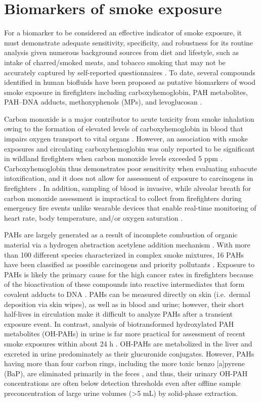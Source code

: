 \documentclass[preprint, 3p,
authoryear]{elsarticle} %
\begin{document}
\section{Biomarkers of smoke
exposure}\label{biomarkers-of-smoke-exposure}

For a biomarker to be considered an effective indicator of smoke
exposure, it must demonstrate adequate sensitivity, specificity, and
robustness for its routine analysis given numerous background sources
from diet and lifestyle, such as intake of charred/smoked meats, and
tobacco smoking that may not be accurately captured by self-reported
questionnaires \citep{18}. To date, several compounds identified in
human biofluids have been proposed as putative biomarkers of wood smoke
exposure in firefighters including carboxyhemoglobin, PAH metabolites,
PAH--DNA adducts, methoxyphenols (MPs), and levoglucosan \citep{19}.

Carbon monoxide is a major contributor to acute toxicity from smoke
inhalation owing to the formation of elevated levels of
carboxyhemoglobin in blood that impairs oxygen transport to vital organs
\citep{20}. However, an association with smoke exposures and circulating
carboxyhemoglobin was only reported to be significant in wildland
firefighters when carbon monoxide levels exceeded 5 ppm \citep{19}.
Carboxyhemoglobin thus demonstrates poor sensitivity when evaluating
subacute intoxification, and it does not allow for assessment of
exposure to carcinogens in firefighters \citep{21}. In addition,
sampling of blood is invasive, while alveolar breath for carbon monoxide
assessment is impractical to collect from firefighters during emergency
fire events \citep{22} unlike wearable devices that enable real-time
monitoring of heart rate, body temperature, and/or oxygen saturation
\citep{23}.

PAHs are largely generated as a result of incomplete combustion of
organic material via a hydrogen abstraction acetylene addition mechanism
\citep{24}. With more than 100 different species characterized in
complex smoke mixtures, 16 PAHs have been classified as possible
carcinogens and priority pollutants \citep{25}. Exposure to PAHs is
likely the primary cause for the high cancer rates in firefighters
because of the bioactivation of these compounds into reactive
intermediates that form covalent adducts to DNA \citep{26}. PAHs can be
measured directly on skin (i.e.~dermal deposition via skin wipes), as
well as in blood and urine; however, their short half-lives in
circulation make it difficult to analyze PAHs after a transient exposure
event. In contrast, analysis of biotransformed hydroxylated PAH
metabolites (OH-PAHs) in urine is far more practical for assessment of
recent smoke exposures within about 24 h \citep[\citet{27}]{19}. OH-PAHs
are metabolized in the liver and excreted in urine predominately as
their glucuronide conjugates. However, PAHs having more than four carbon
rings, including the more toxic benzo {[}a{]}pyrene (BaP), are
eliminated primarily in the feces \citep{28}, and thus, their urinary
OH-PAH concentrations are often below detection thresholds \citep{12}
even after offline sample preconcentration of large urine volumes
(\textgreater5 mL) by solid-phase extraction.
\end{document}
